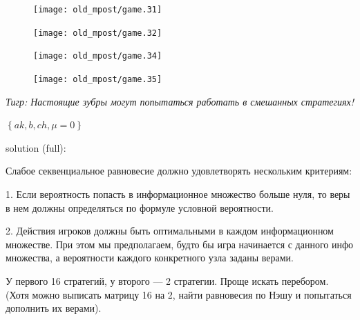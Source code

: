 \begin{problem}[Лес ]
\begin{figure}[htbp]
     \texttt{[image: old\_mpost/game.31]}
\end{figure} \par

\begin{figure}[htbp]
     \texttt{[image: old\_mpost/game.32]}
\end{figure} \par

\begin{figure}[htbp]
     \texttt{[image: old\_mpost/game.34]}
\end{figure}

\begin{figure}[htbp]
     \texttt{[image: old\_mpost/game.35]}
\end{figure}




{\it Тигр: Настоящие зубры могут попытаться работать в смешанных стратегиях!}\par




\begin{sol}

  $\left\{ak,b,ch,\mu =0\right\}$\par

solution (full): \par
Слабое секвенциальное равновесие должно удовлетворять нескольким критериям: \par
1. Если вероятность попасть в информационное множество больше нуля, то веры в нем должны определяться по формуле условной вероятности. \par
2. Действия игроков должны быть оптимальными в каждом информационном множестве. При этом мы предполагаем, будто бы игра начинается с данного инфо множества, а вероятности каждого конкретного узла заданы верами.\par

У первого 16 стратегий, у второго --- 2 стратегии. Проще искать перебором. (Хотя можно выписать матрицу 16 на 2, найти равновесия по Нэшу и попытаться дополнить их верами).\par


\end{sol}
\end{problem}
